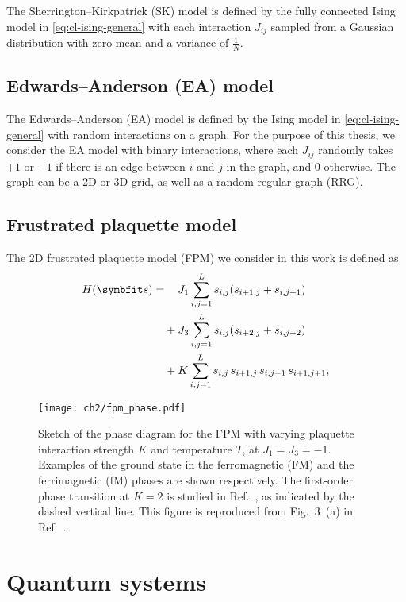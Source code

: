 The Sherrington--Kirkpatrick (SK) model is defined by the fully connected Ising model in \cref{eq:cl-ising-general} with each interaction $J_{i j}$ sampled from a Gaussian distribution with zero mean and a variance of $\frac{1}{N}$.

\subsection{Edwards--Anderson (EA) model}
\label{sec:ea}

The Edwards--Anderson (EA) model is defined by the Ising model in \cref{eq:cl-ising-general} with random interactions on a graph. For the purpose of this thesis, we consider the EA model with binary interactions, where each $J_{i j}$ randomly takes $+1$ or $-1$ if there is an edge between $i$ and $j$ in the graph, and $0$ otherwise. The graph can be a 2D or 3D grid, as well as a random regular graph (RRG).

\subsection{Frustrated plaquette model}
\label{sec:fpm}

The 2D frustrated plaquette model (FPM) we consider in this work is defined as
\begin{align}
H(\vs) = &\phantom{{}+{}} J_1 \sum_{i, j = 1}^L s_{i, j} (s_{i + 1, j} + s_{i, j + 1}) \nonumber \\
&+ J_3 \sum_{i, j = 1}^L s_{i, j} (s_{i + 2, j} + s_{i, j + 2}) \nonumber \\
&+ K \sum_{i, j = 1}^L s_{i, j} \, s_{i + 1, j} \, s_{i, j + 1} \, s_{i + 1, j + 1},
\label{eq:fpm}
\end{align}

\begin{figure}[htb]
\centering
\texttt{[image: ch2/fpm\_phase.pdf]}
\caption[Phase diagram of frustrated plaquette model (FPM)]{
Sketch of the phase diagram for the FPM with varying plaquette interaction strength $K$ and temperature $T$, at $J_1 = J_3 = -1$.
Examples of the ground state in the ferromagnetic (FM) and the ferrimagnetic (fM) phases are shown respectively.
The first-order phase transition at $K = 2$ is studied in Ref.~\cite{wu2021unbiased}, as indicated by the dashed vertical line.
This figure is reproduced from Fig.~3~(a) in Ref.~\cite{wu2021unbiased}.
}
\label{fig:fpm-phase}
\end{figure}

\section{Quantum systems}
\label{sec:qu-sys}

